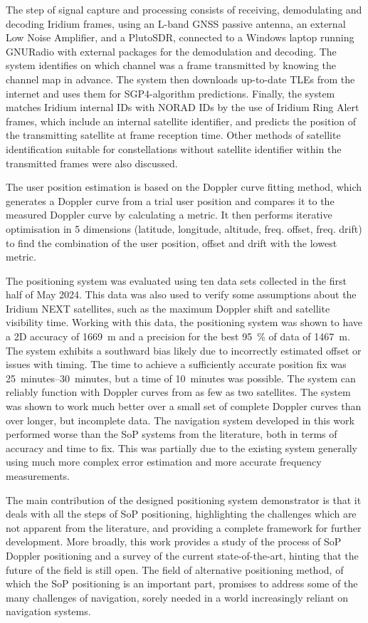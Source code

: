 The step of signal capture and processing consists of receiving, demodulating and decoding Iridium frames, using an L-band GNSS passive antenna, an external Low Noise Amplifier, and a PlutoSDR, connected to a Windows laptop running GNURadio with external packages for the demodulation and decoding. The system identifies on which channel was a frame transmitted by knowing the channel map in advance. The system then downloads up-to-date TLEs from the internet and uses them for SGP4-algorithm predictions. Finally, the system matches Iridium internal IDs with NORAD IDs by the use of Iridium Ring Alert frames, which include an internal satellite identifier, and predicts the position of the transmitting satellite at frame reception time. Other methods of satellite identification suitable for constellations without satellite identifier within the transmitted frames were also discussed.

The user position estimation is based on the Doppler curve fitting method, which generates a Doppler curve from a trial user position and compares it to the measured Doppler curve by calculating a metric. It then performs iterative optimisation in 5 dimensions (latitude, longitude, altitude, freq. offset, freq. drift) to find the combination of the user position, offset and drift with the lowest metric.

The positioning system was evaluated using ten data sets collected in the first half of May 2024. This data was also used to verify some assumptions about the Iridium NEXT satellites, such as the maximum Doppler shift and satellite visibility time. Working with this data, the positioning system was shown to have a 2D accuracy of \qty{1669}{m} and a precision for the best \qty{95}{\percent} of data of \qty{1467}{m}. The system exhibits a southward bias likely due to incorrectly estimated offset or issues with timing. The time to achieve a sufficiently accurate position fix was \qtyrange{25}{30}{minutes}, but a time of \qty{10}{minutes} was possible. The system can reliably function with Doppler curves from as few as two satellites. The system was shown to work much better over a small set of complete Doppler curves than over longer, but incomplete data. The navigation system developed in this work performed worse than the SoP systems from the literature, both in terms of accuracy and time to fix. This was partially due to the existing system generally using much more complex error estimation and more accurate frequency measurements.

The main contribution of the designed positioning system demonstrator is that it deals with all the steps of SoP positioning, highlighting the challenges which are not apparent from the literature, and providing a complete framework for further development. More broadly, this work provides a study of the process of SoP Doppler positioning and a survey of the current state-of-the-art, hinting that the future of the field is still open. The field of alternative positioning method, of which the SoP positioning is an important part, promises to address some of the many challenges of navigation, sorely needed in a world increasingly reliant on navigation systems.
